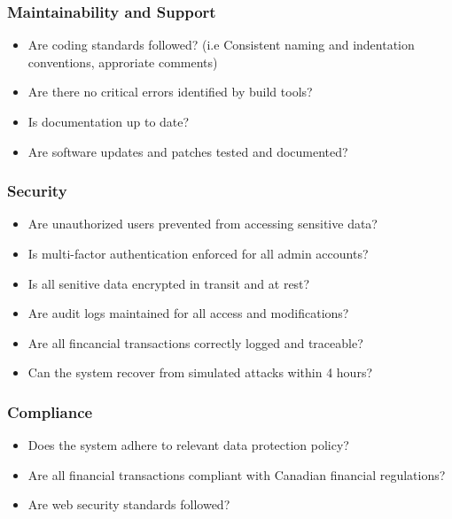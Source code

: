 \documentclass[12pt, titlepage]{article}
\begin{document}
\hypertarget{checklist-nfr14}{}
\subsubsection{Maintainability and Support}
  \begin{itemize}[label=$\square$] %
    \item Are coding standards followed? (i.e Consistent naming and indentation conventions, approriate comments)
    \item Are there no critical errors identified by build tools?
    \item Is documentation up to date?
    \item Are software updates and patches tested and documented?
  \end{itemize}

\hypertarget{checklist-nfr15}{}
\subsubsection{Security}
  \begin{itemize}[label=$\square$] %
    \item Are unauthorized users prevented from accessing sensitive data?
    \item Is multi-factor authentication enforced for all admin accounts?
    \item Is all senitive data encrypted in transit and at rest?
    \item Are audit logs maintained for all access and modifications?
    \item Are all fincancial transactions correctly logged and traceable?
    \item Can the system recover from simulated attacks within 4 hours?
  \end{itemize}

\hypertarget{checklist-nfr17}{}
\subsubsection{Compliance}
  \begin{itemize}[label=$\square$] %
    \item Does the system adhere to relevant data protection policy?
    \item Are all financial transactions compliant with Canadian financial regulations?
    \item Are web security standards followed?
  \end{itemize}
\end{document}

